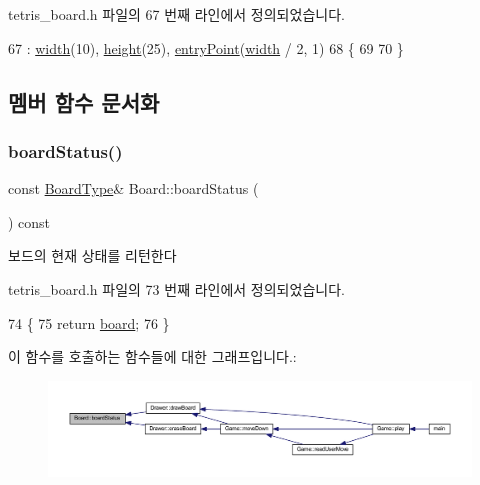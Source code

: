 tetris\+\_\+board.\+h 파일의 67 번째 라인에서 정의되었습니다.


\begin{DoxyCode}
67             : \mbox{\hyperlink{class_board_a5c5b64d99e3c653c425206d2babf2f97}{width}}(10), \mbox{\hyperlink{class_board_a37b65287f3b416ed31b0f15cfd9b3f7c}{height}}(25), \mbox{\hyperlink{class_board_a51d0b870dfe79367034bdda967e63a82}{entryPoint}}(\mbox{\hyperlink{class_board_a5c5b64d99e3c653c425206d2babf2f97}{width}} / 2, 1)
68     \{
69         
70     \}
\end{DoxyCode}


\subsection{멤버 함수 문서화}
\mbox{\label{class_board_ac96b4da16e8dc266b39772f2da3fd7e2}} 
\subsubsection{\texorpdfstring{board\+Status()}{boardStatus()}}
{\footnotesize\ttfamily const \mbox{\hyperlink{class_board_a84bf794bc185e31e333b78bb003c4bc3}{Board\+Type}}\& Board\+::board\+Status (\begin{DoxyParamCaption}{ }\end{DoxyParamCaption}) const\hspace{0.3cm}{\ttfamily [inline]}}



보드의 현재 상태를 리턴한다 



tetris\+\_\+board.\+h 파일의 73 번째 라인에서 정의되었습니다.


\begin{DoxyCode}
74     \{
75         \textcolor{keywordflow}{return} \mbox{\hyperlink{class_board_ad26aada4f19d2ca0c7bd534e8f466b6b}{board}};
76     \}
\end{DoxyCode}
이 함수를 호출하는 함수들에 대한 그래프입니다.\+:
\nopagebreak
\begin{figure}[H]
\begin{center}
\leavevmode
\includegraphics[width=350pt]{class_board_ac96b4da16e8dc266b39772f2da3fd7e2_icgraph}
\end{center}
\end{figure}
\mbox{\label{class_board_a902cd3b288be772ba6b7abc6a822afea}} 

